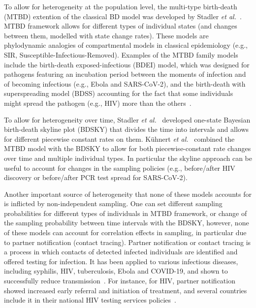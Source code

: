\documentclass[10pt,letterpaper]{article}
\begin{document}
To allow for heterogeneity at the population level, the multi-type birth-death (MTBD) extention of the classical BD model was developed by Stadler \textit{et al.}~\cite{Stadler2013a}. MTBD framework allows for different types of individual states (and changes between them, modelled with state change rates). These models are phylodynamic analogies of compartmental models in classical epidemiology (e.g., SIR, Susceptible-Infectious-Removed).  Examples of the MTBD family models include the birth-death exposed-infectious (BDEI) model, which was designed for pathogens featuring an incubation period between the moments of infection and of becoming infectious (e.g., Ebola and SARS-CoV-2), and the birth-death with superspreading model (BDSS) accounting for the fact that some individuals might spread the pathogen (e.g., HIV) more than the others~\cite{Stadler2014}.

To allow for heterogeneity over time, Stadler \textit{et al.}~\cite{Stadler2013} developed one-state Bayesian birth-death skyline plot (BDSKY) that divides the time into intervals and allows for different piecewise constant rates on them. Kühnert \textit{et al.}~\cite{Kuhnert2016} combined the MTBD model with the BDSKY to allow for both piecewise-constant rate changes over time and multiple individual types. In particular the skyline approach can be useful to account for changes in the sampling policies (e.g., before/after HIV discovery or before/after PCR test spread for SARS-CoV-2).


Another important source of heterogeneity that none of these models accounts for is inflicted by non-independent sampling. One can set different sampling probabilities for different types of individuals in MTBD framework, or change of the sampling probability between time intervals with the BDSKY, however, none of these models can account for correlation effects in sampling, in particular due to partner notification (contact tracing). Partner notification or contact tracing is a process in which contacts of detected infected individuals are identified and offered testing for infection. It has been applied to various infectious diseases, including syphilis, HIV, tuberculosis, Ebola and COVID-19, and shown to successfully reduce transmission~\cite{el-sadrContactTracingBarriers2022}. For instance, for HIV,  partner notification showed increased early referral and initiation of treatment, and several countries include it in their national HIV testing services policies~\cite{worldhealthorganizationCountryPolicyReview2016}. 
\end{document}
